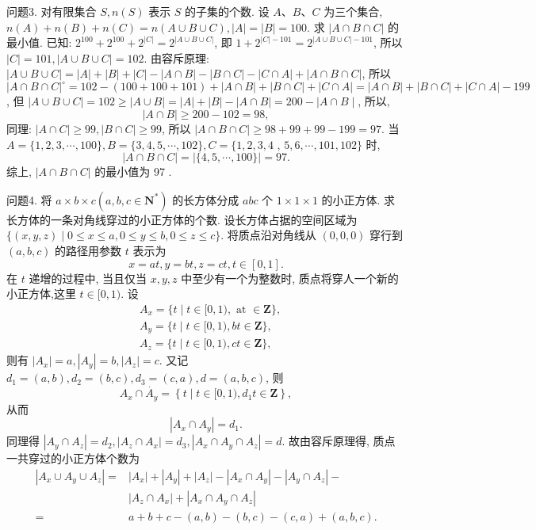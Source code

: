 问题3. 对有限集合 $S, n(S)$ 表示 $S$ 的子集的个数.
设 $A 、 B 、 C$ 为三个集合, $n(A)+ n(B)+n(C)=n(A \cup B \cup C),|A|=|B|=100$. 求 $|A \cap B \cap C|$ 的最小值.
已知: $2^{100}+2^{100}+2^{|C|}=2^{|A \cup B \cup C|}$, 即 $1+2^{|C|-101}=2^{|A \cup B \cup C|-101}$, 所以 $|C|=101,|A \cup B \cup C|=102$.
由容斥原理: $|A \cup B \cup C|=|A|+|B|+|C|-|A \cap B|-|B \cap C|- |C \cap A|+|A \cap B \cap C|$, 所以 $|A \cap B \cap C|^{\circ}=102-(100+100+101)+|A \cap B|+|B \cap C|+|C \cap A|=|A \cap B|+|B \cap C|+|C \cap A|-199$, 但 $|A \cup B \cup C|=102 \geqslant|A \cup B|=|A|+|B|-|A \cap B|=200-\mid A \cap B \mid$, 所以,
$$
|A \cap B| \geqslant 200-102=98,
$$
同理: $|A \cap C| \geqslant 99,|B \cap C| \geqslant 99$, 所以 $|A \cap B \cap C| \geqslant 98+99+ 99-199=97$.
当 $A=\{1,2,3, \cdots, 100\}, B=\{3,4,5, \cdots, 102\}, C=\{1,2,3,4$ , $5,6, \cdots, 101,102\}$ 时,
$$
|A \cap B \cap C|=|\{4,5, \cdots, 100\}|=97 .
$$
综上, $|A \cap B \cap C|$ 的最小值为 97 .



问题4. 将 $a \times b \times c\left(a, b, c \in \mathbf{N}^*\right)$ 的长方体分成 $a b c$ 个 $1 \times 1 \times 1$ 的小正方体.
求长方体的一条对角线穿过的小正方体的个数.
设长方体占据的空间区域为 $\{(x, y, z) \mid 0 \leqslant x \leqslant a, 0 \leqslant y \leqslant b, 0 \leqslant z \leqslant c\}$.
将质点沿对角线从 $(0,0,0)$ 穿行到 $(a, b, c)$ 的路径用参数 $t$ 表示为
$$
x=a t, y=b t, z=c t, t \in[0,1] .
$$
在 $t$ 递增的过程中, 当且仅当 $x, y, z$ 中至少有一个为整数时, 质点将穿人一个新的小正方体,这里 $t \in[0,1)$. 设
$$
\begin{aligned}
& A_x=\{t \mid t \in[0,1), \text { at } \in \mathbf{Z}\}, \\
& A_y=\{t \mid t \in[0,1), b t \in \mathbf{Z}\}, \\
& A_z=\{t \mid t \in[0,1), c t \in \mathbf{Z}\},
\end{aligned}
$$
则有 $\left|A_x\right|=a,\left|A_y\right|=b,\left|A_z\right|=c$.
又记 $d_1=(a, b), d_2=(b, c), d_3=(c, a), d=(a, b, c)$, 则
$$
A_x \cap \dot{A_y}=\left\{t \mid t \in[0,1), d_1 t \in \mathbf{Z}\right\},
$$
从而
$$
\left|A_x \cap A_y\right|=d_1 .
$$
同理得 $\left|A_y \cap A_z\right|=d_2,\left|A_z \cap A_x\right|=d_3,\left|A_x \cap A_y \cap A_z\right|=d$.
故由容斥原理得, 质点一共穿过的小正方体个数为
$$
\begin{aligned}
\left|A_x \cup A_y \cup A_z\right|= & \left|A_x\right|+\left|A_y\right|+\left|A_z\right|-\left|A_x \cap A_y\right|-\left|A_y \cap A_z\right|- \\
& \left|A_z \cap A_x\right|+\left|A_x \cap A_y \cap A_z\right| \\
= & a+b+c-(a, b)-(b, c)-(c, a)+(a, b, c) .
\end{aligned}
$$



